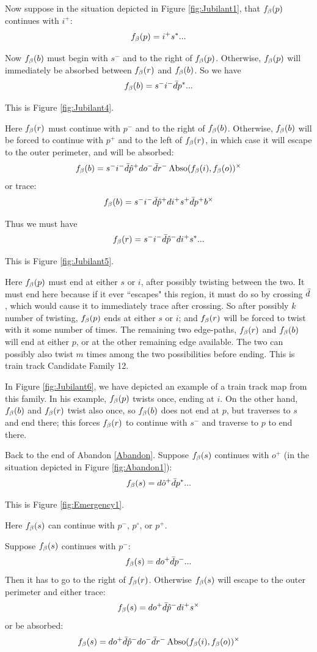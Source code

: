 Now suppose in the situation depicted in Figure \ref{fig:Jubilant1}, that $f_\beta(p)$ continues with $i^+$:
\[
f_\beta(p) = i^+ s^*...
\]

Now $f_\beta(b)$ must begin with $s^-$ and to the right of $f_\beta(p)$. Otherwise, $f_\beta(p)$ will immediately be absorbed between $f_\beta(r)$ and $f_\beta(b)$. So we have
\[
f_\beta(b) = s^- i^- \bar{d} p^*...
\]

This is Figure \ref{fig:Jubilant4}.

Here $f_\beta(r)$ must continue with $p^-$ and to the right of $f_\beta(b)$. Otherwise, $f_\beta(b)$ will be forced to continue with $p^+$ and to the left of $f_\beta(r)$, in which case it will escape to the outer perimeter, and will be absorbed:
\[
f_\beta(b) = s^- i^- \bar{d} \hat{p}^+ d o^- \bar{d} r^- \operatorname{Abso}(f_\beta(i), f_\beta(o))^\times
\]
or trace:
\[
f_\beta(b) = s^- i^- \bar{d} \hat{p}^+ d i^+ s^+ \bar{d} p^+ b^\times
\]

Thus we must have
\[
f_\beta(r) = s^- i^- \bar{d} \hat{p}^- d i^+ s^*...
\]

This is Figure \ref{fig:Jubilant5}.


Here $f_\beta(p)$ must end at either $s$ or $i$, after possibly twisting between the two. It must end here because if it ever ``escapes" this region, it must do so by crossing $\bar{d}$, which would cause it to immediately trace after crossing. So after possibly $k$ number of twisting, $f_\beta(p)$ ends at either $s$ or $i$; and $f_\beta(r)$ will be forced to twist with it some number of times. The remaining two edge-paths, $f_\beta(r)$ and $f_\beta(b)$ will end at either $p$, or at the other remaining edge available. The two can possibly also twist $m$ times among the two possibilities before ending. This is train track Candidate Family 12.

In Figure \ref{fig:Jubilant6}, we have depicted an example of a train track map from this family. In his example, $f_\beta(p)$ twists once, ending at $i$. On the other hand, $f_\beta(b)$ and $f_\beta(r)$ twist also once, so $f_\beta(b)$ does not end at $p$, but traverses to $s$ and end there; this forces $f_\beta(r)$ to continue with $s^-$ and traverse to $p$ to end there.

 \label{Emergency}
Back to the end of Abandon \ref{Abandon}. Suppose $f_\beta(s)$ continues with $o^+$ (in the situation depicted in Figure \ref{fig:Abandon1}):
\[
f_\beta(s) = d \hat{o}^+ \bar{d} p^*...
\]

This is Figure \ref{fig:Emergency1}.

Here $f_\beta(s)$ can continue with $p^-$, $p^\circ$, or $p^+$.

\label{Landscape}
Suppose $f_\beta(s)$ continues with $p^-$:
\[
f_\beta(s) = d o^+ \bar{d} p^-...
\]
Then it has to go to the right of $f_\beta(r)$. Otherwise $f_\beta(s)$ will escape to the outer perimeter and either trace:
\[
f_\beta(s) = d o^+ \bar{d} \hat{p}^- d i^+ s^\times
\]
or be absorbed:
\[
f_\beta(s) = d o^+ \bar{d} \hat{p}^- d o^- \bar{d} r^- \operatorname{Abso}(f_\beta(i), f_\beta(o))^\times
\]

